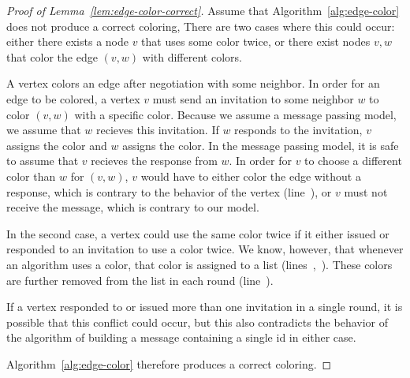 \begin{proof}[Proof of Lemma~\ref{lem:edge-color-correct}]

Assume that Algorithm~\ref{alg:edge-color} does not produce a correct coloring, There are two cases where this could occur: either there exists a node $v$ that uses some color twice, or there exist nodes $v,w$ that color the edge $(v,w)$ with different colors. 

A vertex colors an edge after negotiation with some neighbor. In order for an edge to be colored, a vertex $v$ must send an invitation to some neighbor $w$ to color $(v,w)$ with a specific color. Because we assume a message passing model, we assume that $w$ recieves this invitation. If $w$ responds to the invitation, $v$ assigns the color and $w$ assigns the color. In the message passing model, it is safe to assume that $v$ recieves the response from $w$. In order for $v$ to choose a different color than $w$ for $(v,w)$, $v$ would have to either color the edge without a response, which is contrary to the behavior of the vertex (line~), or $v$ must not receive the message, which is contrary to our model.

In the second case, a vertex could use the same color twice if it either issued or responded to an invitation to use a color twice. We know, however, that whenever an algorithm uses a color, that color is assigned to a list (lines~,~). These colors are further removed from the list in each round (line~).

If a vertex responded to or issued more than one invitation in a single round, it is possible that this conflict could occur, but this also contradicts the behavior of the algorithm of building a message containing a single id in either case.

Algorithm~\ref{alg:edge-color} therefore produces a correct coloring.
\end{proof}
